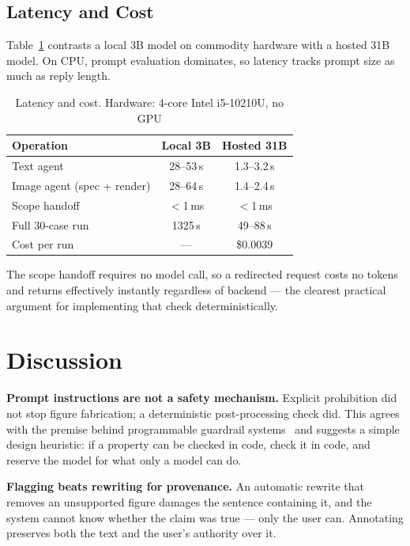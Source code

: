 \documentclass[journal]{IEEEtran}
\begin{document}
\subsection{Latency and Cost}
Table~\ref{tab:perf} contrasts a local 3B model on commodity hardware with a
hosted 31B model. On CPU, prompt evaluation dominates, so latency tracks prompt
size as much as reply length.

\begin{table}[!t]
\caption{Latency and cost. Hardware: 4-core Intel i5-10210U, no GPU}
\label{tab:perf}
\centering
\footnotesize
\begin{tabular}{@{}lcc@{}}
\toprule
Operation & Local 3B & Hosted 31B\\
\midrule
Text agent                & 28--53\,s & 1.3--3.2\,s\\
Image agent (spec + render)& 28--64\,s & 1.4--2.4\,s\\
Scope handoff             & $<$1\,ms & $<$1\,ms\\
Full 30-case run          & 1325\,s & 49--88\,s\\
Cost per run              & --- & \$0.0039\\
\bottomrule
\end{tabular}
\end{table}

The scope handoff requires no model call, so a redirected request costs no
tokens and returns effectively instantly regardless of backend --- the clearest
practical argument for implementing that check deterministically.

\section{Discussion}
\label{sec:discussion}

\textbf{Prompt instructions are not a safety mechanism.} Explicit prohibition
did not stop figure fabrication; a deterministic post-processing check did. This
agrees with the premise behind programmable guardrail
systems~\cite{rebedea2023nemo} and suggests a simple design heuristic: if a
property can be checked in code, check it in code, and reserve the model for
what only a model can do.

\textbf{Flagging beats rewriting for provenance.} An automatic rewrite that
removes an unsupported figure damages the sentence containing it, and the system
cannot know whether the claim was true --- only the user can. Annotating
preserves both the text and the user's authority over it.
\end{document}
